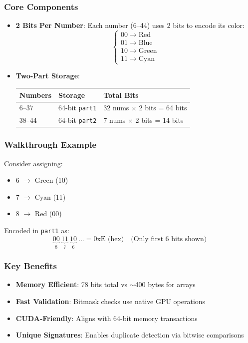 \documentclass[12pt]{article}
\begin{document}
\subsubsection{Core Components}
\begin{itemize}
    \item \textbf{2 Bits Per Number}: Each number (6--44) uses 2 bits to encode its color:
    \[
    \begin{cases}
        00 \rightarrow \text{Red} \\
        01 \rightarrow \text{Blue} \\
        10 \rightarrow \text{Green} \\
        11 \rightarrow \text{Cyan}
    \end{cases}
    \]
    
    \item \textbf{Two-Part Storage}:
    \begin{center}
        \begin{tabular}{lll}
            \toprule
            Numbers & Storage & Total Bits \\
            \midrule
            6--37 & 64-bit \texttt{part1} & 32 nums $\times$ 2 bits = 64 bits \\
            38--44 & 64-bit \texttt{part2} & 7 nums $\times$ 2 bits = 14 bits \\
            \bottomrule
        \end{tabular}
    \end{center}
\end{itemize}

\subsubsection{Walkthrough Example}
Consider assigning:
\begin{itemize}
    \item 6 $\rightarrow$ Green (10)
    \item 7 $\rightarrow$ Cyan (11)
    \item 8 $\rightarrow$ Red (00)
\end{itemize}

Encoded in \texttt{part1} as:
\[
\underbrace{00}_{\text{8}} \ \underbrace{11}_{\text{7}} \ \underbrace{10}_{\text{6}} \ \texttt{...} = \text{0xE (hex)} \quad \text{(Only first 6 bits shown)}
\]

\subsubsection{Key Benefits}
\begin{itemize}
    \item \textbf{Memory Efficient}: 78 bits total vs $\sim$400 bytes for arrays
    \item \textbf{Fast Validation}: Bitmask checks use native GPU operations
    \item \textbf{CUDA-Friendly}: Aligns with 64-bit memory transactions
    \item \textbf{Unique Signatures}: Enables duplicate detection via bitwise comparisons
\end{itemize}
\end{document}
